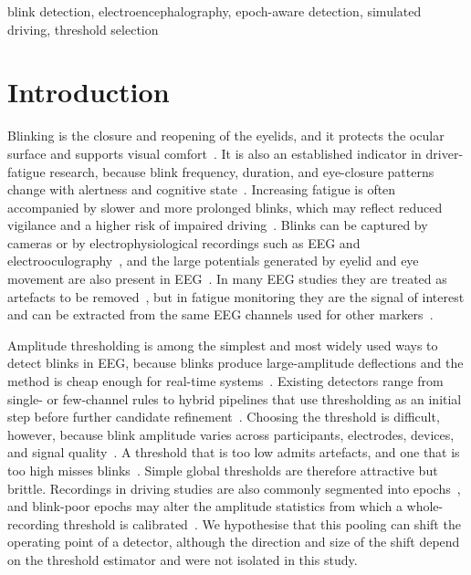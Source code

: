 \documentclass[journal,twoside,web]{ieeecolor}
\begin{document}
\begin{IEEEkeywords}
blink detection, electroencephalography, epoch-aware detection, simulated
driving, threshold selection
\end{IEEEkeywords}

\section{Introduction}

Blinking is the closure and reopening of the eyelids, and it protects the ocular surface and supports visual comfort~\citep{nystrm2024what}. It is also an established indicator in driver-fatigue research, because blink frequency, duration, and eye-closure patterns change with alertness and cognitive state~\citep{alyan2023blink,ren2019comparison,tian2021fatigue}. Increasing fatigue is often accompanied by slower and more prolonged blinks, which may reflect reduced vigilance and a higher risk of impaired driving~\citep{alyan2023blink}. Blinks can be captured by cameras or by electrophysiological recordings such as EEG and electrooculography~\citep{tian2021fatigue,shahbakhti2023fusion}, and the large potentials generated by eyelid and eye movement are also present in EEG~\citep{croft2000removal,akuthota2023artifacts,agarwal2019blink}. In many EEG studies they are treated as artefacts to be removed~\citep{croft2000removal,klein2013reliable}, but in fatigue monitoring they are the signal of interest and can be extracted from the same EEG channels used for other markers~\citep{ko2020eyeblink,shahbakhti2023fusion}.

Amplitude thresholding is among the simplest and most widely used ways to detect blinks in EEG, because blinks produce large-amplitude deflections and the method is cheap enough for real-time systems~\citep{chang2016detection,tran2021detection,jefri2022eye,kleifges2017blinker}. Existing detectors range from single- or few-channel rules to hybrid pipelines that use thresholding as an initial step before further candidate refinement~\citep{nolan2010faster,ghosh2023automatic,zhang2023method,cao2021unsupervised,valderrama2018automatic}. Choosing the threshold is difficult, however, because blink amplitude varies across participants, electrodes, devices, and signal quality~\citep{guttmann2019new,wang2022multidimensional}. A threshold that is too low admits artefacts, and one that is too high misses blinks~\citep{tran2021detection,jefri2022eye}. Simple global thresholds are therefore attractive but brittle. Recordings in driving studies are also commonly segmented into epochs~\citep{cao2019multichannel}, and blink-poor epochs may alter the amplitude statistics from which a whole-recording threshold is calibrated~\citep{klein2013reliable,guttmann2019new}. We hypothesise that this pooling can shift the operating point of a detector, although the direction and size of the shift depend on the threshold estimator and were not isolated in this study.
\end{document}
